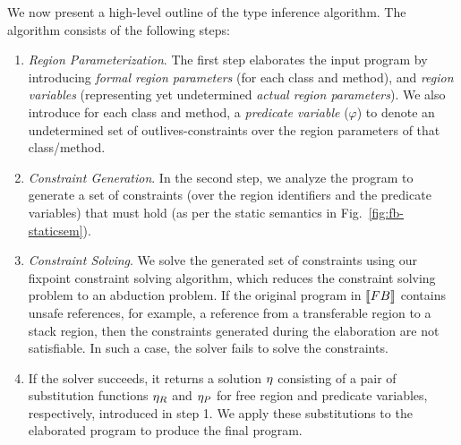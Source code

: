 We now present a high-level outline of the type inference algorithm.
The algorithm consists of the following steps:
\begin{enumerate}
 \item \emph{Region Parameterization}.
   The first step elaborates the input program by introducing \emph{formal region parameters}
   (for each class and method), and \emph{region variables} (representing yet undetermined
   \emph{actual region parameters}). We also introduce for each class and method, a
   \emph{predicate variable} ($\varphi$) to denote an undetermined set of outlives-constraints
   over the region parameters of that class/method.

 \item \emph{Constraint Generation}.
   In the second step, we analyze the program to generate a set of constraints
   (over the region identifiers and the predicate variables)
   that must hold (as per the static semantics in Fig.~\ref{fig:fb-staticsem}).

 \item \emph{Constraint Solving}.
   We solve the generated set of constraints using our fixpoint constraint
   solving algorithm, which reduces the constraint solving problem to
   an abduction problem. If the original program in $\llbracket {\sc FB} \rrbracket$ contains unsafe
   references, for example, a reference from a transferable region to a
   stack region, then the constraints generated during the elaboration
   are not satisfiable. In such a case, the solver fails to solve
   the constraints.

 \item If the solver succeeds, it returns a solution $\eta$ consisting of a
   pair of substitution functions $\eta_R$ and $\eta_P$ for
   free region and predicate variables, respectively, introduced in step 1.
   We apply these substitutions to the elaborated program to produce the final program.
\end{enumerate}

% 

